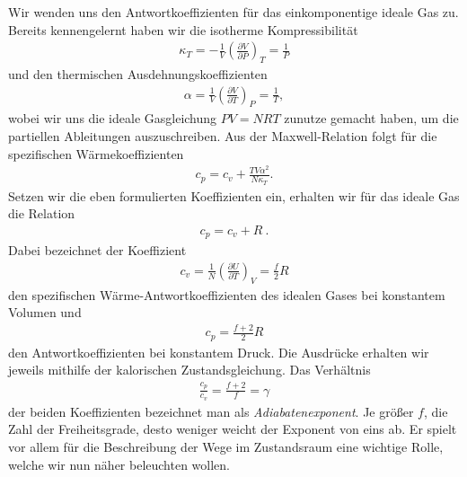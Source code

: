 Wir wenden uns den Antwortkoeffizienten für das einkomponentige ideale Gas zu. Bereits kennengelernt haben wir die isotherme Kompressibilität 
\begin{align*}
    \kappa_T=-\frac{1}{V}\left(\frac{\partial V}{\partial P}\right)_T=\frac{1}{P}
\end{align*} 
und den thermischen Ausdehnungskoeffizienten 
\begin{align*}
    \alpha=\frac{1}{V}\left(\frac{\partial V}{\partial T}\right)_P=\frac{1}{T},
\end{align*}
wobei wir uns die ideale Gasgleichung $PV=NRT$ zunutze gemacht haben, um die partiellen Ableitungen auszuschreiben.
Aus der Maxwell-Relation folgt für die spezifischen Wärmekoeffizienten 
\begin{align*}
    c_p=c_v+\frac{TV\alpha^2}{N\kappa_T}.
\end{align*}
Setzen wir die eben formulierten Koeffizienten ein, erhalten wir für das ideale Gas die Relation 
\begin{align*}
    \boxed{c_p=c_v+R}\:.
\end{align*}
Dabei bezeichnet der Koeffizient 
\begin{align*}
    c_v=\frac{1}{N}\left(\frac{\partial U}{\partial T}\right)_V=\frac{f}{2}R
\end{align*}
den spezifischen Wärme-Antwortkoeffizienten des idealen Gases bei konstantem Volumen und 
\begin{align*}
    c_p=\frac{f+2}{2}R
\end{align*}
den Antwortkoeffizienten bei konstantem Druck. Die Ausdrücke erhalten wir jeweils mithilfe der kalorischen Zustandsgleichung.
Das Verhältnis 
\begin{align*}
    \frac{c_p}{c_v}=\frac{f+2}{f}=\gamma
\end{align*}
der beiden Koeffizienten bezeichnet man als \emph{Adiabatenexponent}.
Je größer $f$, die Zahl der Freiheitsgrade, desto weniger weicht der Exponent von eins ab.
Er spielt vor allem für die Beschreibung der Wege im Zustandsraum eine wichtige Rolle, welche wir nun näher beleuchten wollen.

